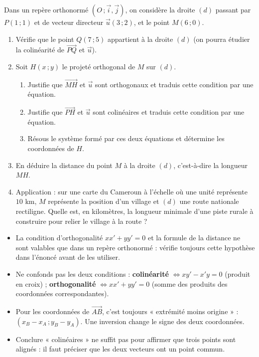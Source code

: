 \documentclass[11pt]{article}
\newcommand{\cle}[1]{{\popxbold\color{popdark}#1}}
\begin{document}
\begin{exercice}
Dans un repère orthonormé $(O\,;\vec{i},\vec{j})$, on considère la droite $(d)$ passant par $P(1\,;1)$ et de vecteur directeur $\vec{u}(3\,;2)$, et le point $M(6\,;0)$.
\begin{enumerate}
\item Vérifie que le point $Q(7\,;5)$ appartient à la droite $(d)$ (on pourra étudier la colinéarité de $\overrightarrow{PQ}$ et $\vec{u}$).
\item Soit $H(x\,;y)$ le projeté orthogonal de $M$ sur $(d)$.
\begin{enumerate}
\item Justifie que $\overrightarrow{MH}$ et $\vec{u}$ sont orthogonaux et traduis cette condition par une équation.
\item Justifie que $\overrightarrow{PH}$ et $\vec{u}$ sont colinéaires et traduis cette condition par une équation.
\item Résous le système formé par ces deux équations et détermine les coordonnées de $H$.
\end{enumerate}
\item En déduire la distance du point $M$ à la droite $(d)$, c'est-à-dire la longueur $MH$.
\item Application : sur une carte du Cameroun à l'échelle où une unité représente $10$ km, $M$ représente la position d'un village et $(d)$ une route nationale rectiligne. Quelle est, en kilomètres, la longueur minimale d'une piste rurale à construire pour relier le village à la route ?
\end{enumerate}
\end{exercice}

\begin{attention}
\begin{itemize}
\item La condition d'orthogonalité $xx'+yy' = 0$ et la formule de la distance ne sont valables que dans un repère \cle{orthonormé} : vérifie toujours cette hypothèse dans l'énoncé avant de les utiliser.
\item Ne confonds pas les deux conditions : \textbf{colinéarité} $\Leftrightarrow xy'-x'y = 0$ (produit en croix) ; \textbf{orthogonalité} $\Leftrightarrow xx'+yy' = 0$ (somme des produits des coordonnées correspondantes).
\item Pour les coordonnées de $\overrightarrow{AB}$, c'est toujours « extrémité moins origine » : $(x_B-x_A\,;y_B-y_A)$. Une inversion change le signe des deux coordonnées.
\item Conclure « colinéaires » ne suffit pas pour affirmer que trois points sont alignés : il faut préciser que les deux vecteurs ont un point commun.
\end{itemize}
\end{attention}
\end{document}
